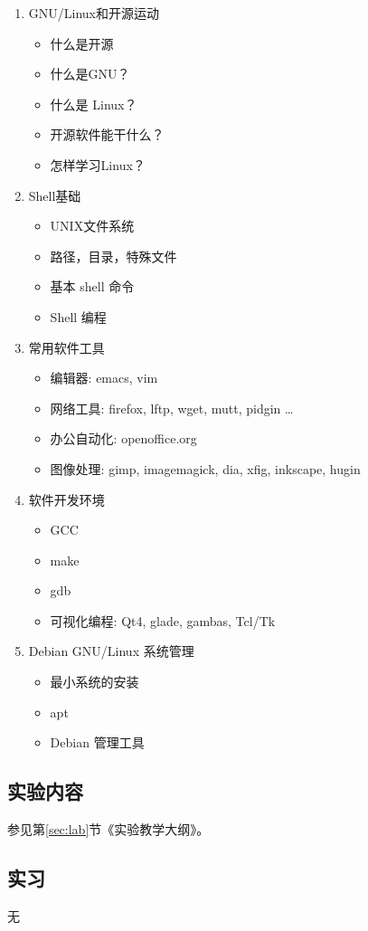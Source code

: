 \documentclass{wx672ctexart}
\begin{document}
\begin{enumerate}
\item GNU/Linux和开源运动
\begin{itemize}
\item 什么是开源
\item 什么是GNU？
\item 什么是 Linux？
\item 开源软件能干什么？
\item 怎样学习Linux？
\end{itemize}
\item Shell基础
\begin{itemize}
\item UNIX文件系统
\item 路径，目录，特殊文件
\item 基本 shell 命令
\item Shell 编程
\end{itemize}
\item 常用软件工具
\begin{itemize}
\item 编辑器: emacs, vim
\item 网络工具: firefox, lftp, wget, mutt, pidgin \ldots{}
\item 办公自动化: openoffice.org
\item 图像处理: gimp, imagemagick, dia, xfig, inkscape, hugin
\end{itemize}
\item 软件开发环境
\begin{itemize}
\item GCC
\item make
\item gdb
\item 可视化编程: Qt4, glade, gambas, Tcl/Tk
\end{itemize}
\item Debian GNU/Linux 系统管理
\begin{itemize}
\item 最小系统的安装
\item apt
\item Debian 管理工具
\end{itemize}
\end{enumerate}
\subsection{实验内容}

参见第\ref{sec:lab}节《实验教学大纲》。

\subsection{实习}
无
\end{document}
